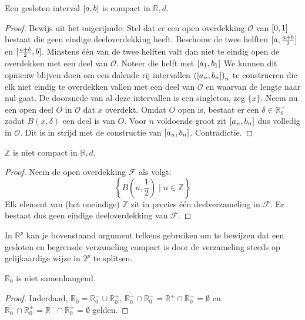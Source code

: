\documentclass[main.tex]{subfiles}
\begin{document}
\begin{vb}
  Een gesloten interval $\interval{a}{b}$ is compact in $\mathbb{R},d$.

  \begin{proof}
    Bewijs uit het ongerijmde:
    Stel dat er een open overdekking $\mathcal{O}$ van $\interval{0}{1}$ bestaat die geen eindige deeloverdekking heeft.
    Beschouw de twee helften $\interval{a}{\frac{a+b}{2}}$ en $\interval{\frac{a+b}{2}}{b}$.
    Minstens \'e\'en van de twee helften valt dan niet te eindig open de overdekken met een deel van $\mathcal{O}$.\waarom
    Noteer die helft met $\interval{a_{1}}{b_{1}}$
    We kunnen dit opnieuw blijven doen om een dalende rij intervallen $\left(\interval{a_{n}}{b_{n}}\right)_{n}$ te construeren die elk niet eindig te overdekken vallen met een deel van $\mathcal{O}$ en waarvan de lengte naar nul gaat.
    De doorsnede van al deze intervallen is een singleton, zeg $\{x\}$.
    Neem nu een open deel $O$ in $\mathcal{O}$ dat $x$ overdekt.
    Omdat $O$ open is, bestaat er een $\delta \in \mathbb{R}_{0}^{+}$ zodat $B(x,\delta)$ een deel is van $O$.
    Voor $n$ voldoende groot  zit $\interval{a_{n}}{b_{n}}$ dus volledig in $\mathcal{O}$.
    Dit is in strijd met de constructie van $\interval{a_{n}}{b_{n}}$.
    Contradictie.
  \end{proof}
\end{vb}

\begin{vb}
  $\mathbb{Z}$ is niet compact in $\mathbb{R},d$.

  \begin{proof}
    Neem de open overdekking $\mathcal{F}$ als volgt:
    \[ \left\{ B\left(n,\frac{1}{2}\right) \mid n \in \mathbb{Z} \right\} \]
    Elk element van (het oneindige) $\mathbb{Z}$ zit in precies \'e\'en deelverzameling in $\mathcal{F}$.
    Er bestaat dus geen eindige deeloverdekking van $\mathcal{F}$.
  \end{proof}
\end{vb}

\begin{opm}
  In $\mathbb{R}^{p}$ kan je bovenstaand argument telkens gebruiken om te bewijzen dat een gesloten en begrensde verzameling compact is door de verzameling steeds op gelijkaardige wijze in $2^{p}$ te splitsen.
\end{opm}

\begin{vb}
  \label{vb:r_0-niet-samenhangend}
  $\mathbb{R}_{0}$ is niet samenhangend.

  \begin{proof}
    Inderdaad, $\mathbb{R}_{0} = \mathbb{R}_{0}^{-} \cup \mathbb{R}_{0}^{+}$, $\overline{\mathbb{R}_{0}^{+}} \cap \mathbb{R}_{0}^{-} = \mathbb{R}^{+} \cap \mathbb{R}_{0}^{-} = \emptyset$ en $\overline{\mathbb{R}_{0}^{-}} \cap \mathbb{R}_{0}^{+} = \mathbb{R}^{-} \cap \mathbb{R}_{0}^{+} = \emptyset$ gelden. 
  \end{proof}
\end{vb}
\end{document}
